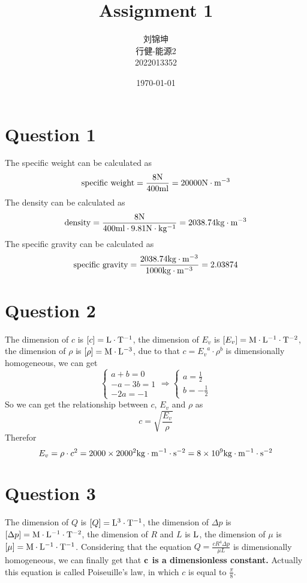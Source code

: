 \documentclass[UTF8]{ctexart}
\title{Assignment 1}
\author{刘锦坤\\行健-能源2\\2022013352}
\date{\today}
\def\r#1{{\rm #1}}
\def\b#1{{\bf #1}}
\def\c{\cdot}
\begin{document}
\fancyfoot[C]{\thepage}

\maketitle
\tableofcontents

\section{Question 1}
The specific weight can be calculated as
$$
    \r{specific} \ \r{weight}= \frac{8 \r{N}}{400 \r{ml}} = 20000 \r{N \c m^{-3}}
$$
\noindent The density can be calculated as
$$
    \r{density} = \frac{8 \r{N}}{400 \r{ml} \c 9.81 \r{N \c kg^{-1}}} = 2038.74 \r{kg \c m^{-3}}
$$
\noindent The specific gravity can be calculated as
$$
    \r{specific} \ \r{gravity} = \frac{2038.74 \r{kg \c m^{-3}}}{1000 \r{kg \c m^{-3}}} = 2.03874
$$

\section{Question 2}
The dimension of $c$ is $[c]=\r{L \c T^{-1}}$, 
the dimension of $E_v$ is $[E_v]=\r{M \c L^{-1} \c T^{-2}}$, 
the dimension of $\rho$ is $[\rho] = \r{M \c L^{-3}}$, 
due to that $c = {E_v}^a\c \rho^b$ is dimensionally homogeneous, we can get
$$
\begin{cases}
    a + b = 0\\
    -a - 3b = 1\\
    -2a = -1
\end{cases}
\Rightarrow
\begin{cases}
    a = \frac{1}{2}\\
    b = -\frac{1}{2}
\end{cases}
$$
\noindent So we can get the relationship between $c$, $E_v$ and $\rho$ as
$$
    c = \sqrt{\frac{E_v}{\rho}}
$$
Therefor
$$
    E_v = \rho \c c^2 = 2000 \times 2000^2 \r{kg \c m^{-1} \c s^{-2}} = 8 \times 10^9 \r{kg \c m^{-1} \c s^{-2}}
$$

\section{Question 3}
The dimension of $Q$ is $[Q]=\r{L^3 \c T^{-1}}$,
the dimension of $\Delta p$ is $[\Delta p]=\r{M \c L^{-1} \c T^{-2}}$,
the dimension of $R$ and $L$ is $\r{L}$,
the dimension of $\mu$ is $[\mu]=\r{M \c L^{-1} \c T^{-1}}$.
Considering that the equation $Q = \frac{c R^4 \Delta p}{\mu L}$ is dimensionally homogeneous,
we can finally get that \b{$\bf{c}$ is a dimensionless constant.}
Actually this equation is called Poiseuille's law, in which $c$ is equal to $\frac \pi 8$.
\end{document}
